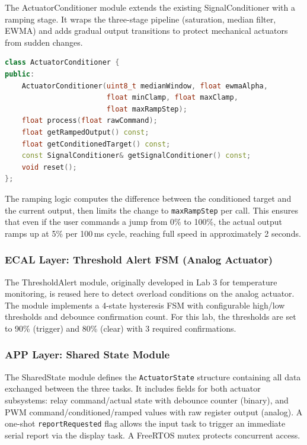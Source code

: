 The ActuatorConditioner module extends the existing SignalConditioner with a ramping stage. It wraps the three-stage pipeline (saturation, median filter, EWMA) and adds gradual output transitions to protect mechanical actuators from sudden changes.

\begin{lstlisting}[language=C++, caption=ActuatorConditioner interface (ActuatorConditioner.h), label=lst:act_cond_h]
class ActuatorConditioner {
public:
    ActuatorConditioner(uint8_t medianWindow, float ewmaAlpha,
                        float minClamp, float maxClamp,
                        float maxRampStep);
    float process(float rawCommand);
    float getRampedOutput() const;
    float getConditionedTarget() const;
    const SignalConditioner& getSignalConditioner() const;
    void reset();
};
\end{lstlisting}

The ramping logic computes the difference between the conditioned target and the current output, then limits the change to \texttt{maxRampStep} per call. This ensures that even if the user commands a jump from 0\% to 100\%, the actual output ramps up at 5\% per 100\,ms cycle, reaching full speed in approximately 2 seconds.

\subsubsection{ECAL Layer: Threshold Alert FSM (Analog Actuator)}

The ThresholdAlert module, originally developed in Lab 3 for temperature monitoring, is reused here to detect overload conditions on the analog actuator. The module implements a 4-state hysteresis FSM with configurable high/low thresholds and debounce confirmation count. For this lab, the thresholds are set to 90\% (trigger) and 80\% (clear) with 3 required confirmations.

\subsubsection{APP Layer: Shared State Module}

The SharedState module defines the \texttt{ActuatorState} structure containing all data exchanged between the three tasks. It includes fields for both actuator subsystems: relay command/actual state with debounce counter (binary), and PWM command/conditioned/ramped values with raw register output (analog). A one-shot \texttt{reportRequested} flag allows the input task to trigger an immediate serial report via the display task. A FreeRTOS mutex protects concurrent access.

